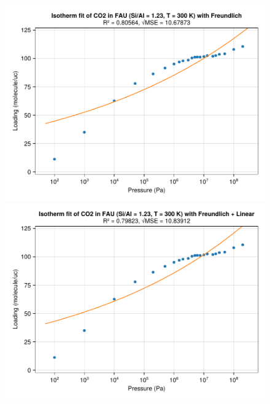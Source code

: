 \documentclass[main.tex]{subfiles}
\begin{document}
\begin{figure}
	\begin{minipage}{0.49\columnwidth}
		\includegraphics[width=\columnwidth]{figures/isotherms/Freundlich.pdf}
	\end{minipage}\hfill%
	\begin{minipage}{0.49\columnwidth}
		\includegraphics[width=\columnwidth]{figures/isotherms/Freundlich + Linear.pdf}
	\end{minipage}
	

\end{figure}
\end{document}
